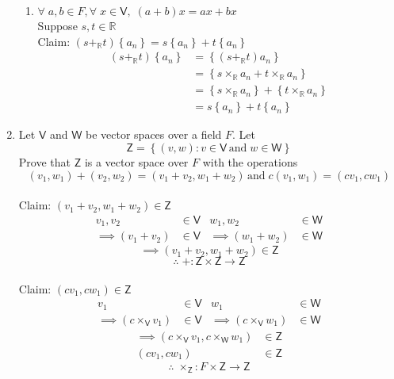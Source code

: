 \documentclass[letterpaper,12pt]{article}
\newcommand{\?}{\stackrel{?}{=}}
\begin{document}
\begin{spacing}{1.5}
\begin{enumerate}
\begin{enumerate}[(VS 1)]
\item$\forall\; a,b \in F, \forall\; x \in \mathsf{V}, \;
  \left(a+b\right)x = ax + bx$
\\
Suppose $s,t \in \mathbb{R}$ 
\\
Claim: $\left(s +_\mathbb{R} t\right)\left\{a_n\right\} =
s\left\{a_n\right\} + t\left\{a_n\right\}$
\begin{align}
\left(s+_\mathbb{R}t\right)\left\{a_n\right\} &= 
\left\{\left(s+_\mathbb{R}t\right)a_n\right\}\\
&= \left\{s\times_\mathbb{R}a_n+t\times_\mathbb{R}a_n\right\}\\
&= \left\{s\times_\mathbb{R}a_n\right\} +
\left\{t\times_\mathbb{R}a_n\right\}\\
&= s\left\{a_n\right\} + t\left\{a_n\right\}
\end{align}
\end{enumerate}
\newpage{}
\item Let $\mathsf{V}$ and $\mathsf{W}$ be vector spaces over a field
  $F$. Let 
\[
\mathsf{Z} = \left\{\left(v,w\right)\colon v \in \mathsf{V} \,\mathrm{and}\; w
  \in \mathsf{W}\right\}
\]
Prove that $\mathsf{Z}$ is a vector space over $F$ with the operations 
\[
\left(v_1, w_1\right) + \left(v_2, w_2\right) = \left(v_1 + v_2, w_1 +
  w_2\right) \, \mathrm{and}\; c\left(v_1, w_1\right) = \left(cv_1, cw_1\right)
\]
\\
Claim: $\left(v_1 + v_2, w_1 + w_2\right) \in \mathsf{Z}$
\begin{align}
v_1,v_2 &\in \mathsf{V} & w_1, w_2 &\in \mathsf{W}\\
\implies \left(v_1 + v_2\right) &\in \mathsf{V} & \implies
\left(w_1+w_2\right) &\in \mathsf{W}
\end{align}
\begin{equation}
\implies \left(v_1 + v_2, w_1 + w_2\right) \in \mathsf{Z}
\end{equation}
\begin{equation}
\therefore\; + \colon \mathsf{Z} \times \mathsf{Z} \to \mathsf{Z}
\end{equation}
\\
Claim: $\left(cv_1, cw_1\right) \in \mathsf{Z}$
\begin{align}
v_1 &\in \mathsf{V} & w_1 &\in \mathsf{W}\\
\implies \left(c \times_\mathsf{V} v_1\right) &\in \mathsf{V} & \implies
\left(c\times_\mathsf{V}w_1\right) &\in \mathsf{W}
\end{align}
\begin{align}
\implies \left(c\times_\mathsf{V} v_1, c\times_\mathsf{W}w_1\right)
&\in \mathsf{Z}\\
\left(cv_1, cw_1\right) &\in \mathsf{Z}
\end{align}
\begin{equation}
\therefore\; \times_\mathsf{Z} \colon F \times \mathsf{Z} \to \mathsf{Z}
\end{equation}


\end{enumerate}
\end{spacing}
\end{document}
